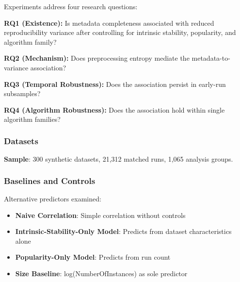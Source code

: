 
Experiments address four research questions:

\textbf{RQ1 (Existence):} Is metadata completeness associated with reduced reproducibility variance after controlling for intrinsic stability, popularity, and algorithm family?

\textbf{RQ2 (Mechanism):} Does preprocessing entropy mediate the metadata-to-variance association?

\textbf{RQ3 (Temporal Robustness):} Does the association persist in early-run subsamples?

\textbf{RQ4 (Algorithm Robustness):} Does the association hold within single algorithm families?

\subsubsection{Datasets}

\begin{table}[htbp]
\centering
{}
\end{table}

\textbf{Sample}: 300 synthetic datasets, 21,312 matched runs, 1,065 analysis groups.

\subsubsection{Baselines and Controls}

Alternative predictors examined:
\begin{itemize}
\item \textbf{Naive Correlation}: Simple correlation without controls
\item \textbf{Intrinsic-Stability-Only Model}: Predicts from dataset characteristics alone
\item \textbf{Popularity-Only Model}: Predicts from run count
\item \textbf{Size Baseline}: log(NumberOfInstances) as sole predictor
\end{itemize}

